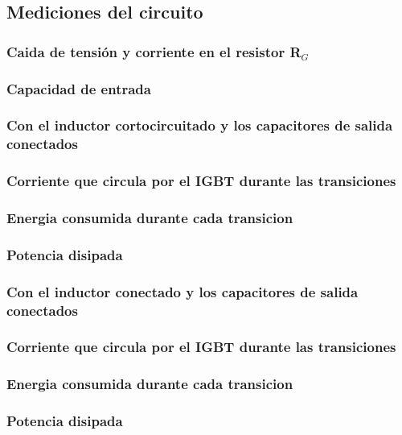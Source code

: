 \documentclass[a4paper,10pt]{article}
\begin{document}
\subsection{Mediciones del circuito}

\subsubsection{Caida de tensión y corriente en el resistor R$_ {G}$}

\subsubsection{Capacidad de entrada}

\subsubsection{Con el inductor cortocircuitado y los capacitores de salida conectados}

\subsubsection*{Corriente que circula por el IGBT durante las transiciones}
\subsubsection*{Energia consumida durante cada transicion}
\subsubsection*{Potencia disipada}

\subsubsection{Con el inductor conectado y los capacitores de salida conectados}

\subsubsection*{Corriente que circula por el IGBT durante las transiciones}
\subsubsection*{Energia consumida durante cada transicion}
\subsubsection*{Potencia disipada}
\end{document}
